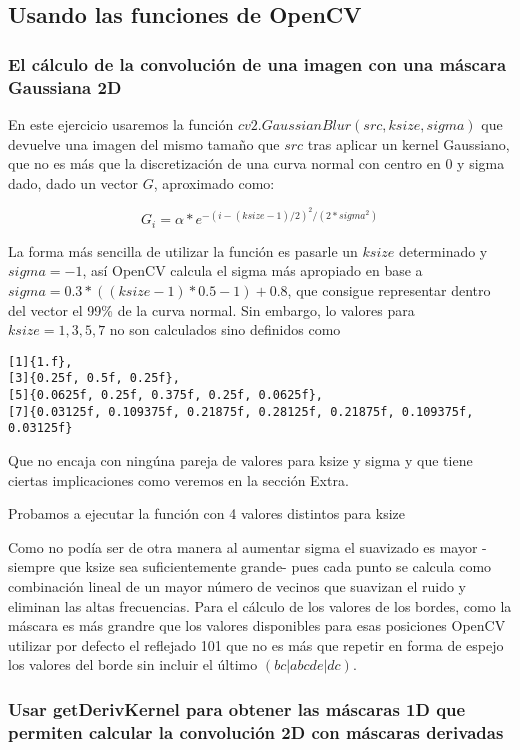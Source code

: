 \documentclass{article}
\newcommand{\img}[2]{
\noindent\makebox[\textwidth][c]{\texttt{[image: \#1]}}%
}
\begin{document}
\subsection{Usando las funciones de OpenCV}
\subsubsection{El cálculo de la convolución de una imagen con una máscara Gaussiana 2D}

En este ejercicio usaremos la función $cv2.GaussianBlur(src,ksize,sigma)$ que devuelve una imagen
del mismo tamaño que $src$ tras aplicar un kernel Gaussiano, que no es más que la discretización de una curva normal con centro en 0 y sigma dado, dado un vector $G$, aproximado como:

\[G_i= \alpha*e^{-(i-(ksize-1)/2)^2/(2*sigma^2)}\]

\img{eximg/ej1_normal}{0.6}

La forma más sencilla de utilizar la función es pasarle un $ksize$ determinado y $sigma=-1$, así OpenCV calcula el sigma más apropiado en base a $sigma=0.3*((ksize-1)*0.5 - 1) + 0.8$, que consigue representar dentro del vector el 99\% de la curva normal. Sin embargo, lo valores para $ksize={1,3,5,7}$ no son calculados sino definidos como

\begin{lstlisting}
[1]{1.f},
[3]{0.25f, 0.5f, 0.25f},
[5]{0.0625f, 0.25f, 0.375f, 0.25f, 0.0625f},
[7]{0.03125f, 0.109375f, 0.21875f, 0.28125f, 0.21875f, 0.109375f, 0.03125f}
\end{lstlisting}

Que no encaja con ningúna pareja de valores para ksize y sigma y que tiene ciertas implicaciones como veremos en la sección Extra.

Probamos a ejecutar la función con 4 valores distintos para ksize

\img{eximg/ej1}{1.2}

Como no podía ser de otra manera al aumentar sigma el suavizado es mayor -siempre que ksize sea suficientemente grande- pues cada punto se calcula como combinación lineal de un mayor número de vecinos que suavizan el ruido y eliminan las altas frecuencias. Para el cálculo de los valores de los bordes, como la máscara es más grandre que los valores disponibles para esas posiciones OpenCV utilizar por defecto el reflejado 101 que no es más que repetir en forma de espejo los valores del borde sin incluir el último $(bc|abcde|dc)$.

\subsubsection{Usar getDerivKernel para obtener las máscaras 1D que permiten calcular la convolución 2D con máscaras derivadas}
\end{document}
